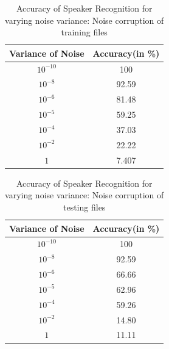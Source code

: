 \documentclass{article}
\begin{document}
{\begin{table}[!h]
\centering
\begin{tabular}{|c|c|}
\hline
\multicolumn{1}{|l|}{Variance of Noise} & \multicolumn{1}{l|}{Accuracy(in \%)} \\ \hline
$10^{-10}$               & 100                                 \\ \hline
$10^{-8}$                & 92.59                               \\ \hline
$10^{-6}$                & 81.48                               \\ \hline
$10^{-5}$                & 59.25                               \\ \hline
$10^{-4}$                & 37.03                               \\ \hline
$10^{-2}$                & 22.22                               \\ \hline
$1$                       & 7.407                              \\ \hline
\end{tabular}
\caption{Accuracy of Speaker Recognition for varying noise variance: Noise corruption of training files}
\label{Table1}
\end{table}

\begin{table}[!h]
\centering
\begin{tabular}{|c|c|}
\hline
\multicolumn{1}{|l|}{Variance of Noise} & \multicolumn{1}{l|}{Accuracy(in \%)} \\ \hline
$10^{-10}$               & 100                                 \\ \hline
$10^{-8}$                & 92.59                               \\ \hline
$10^{-6}$                & 66.66                               \\ \hline
$10^{-5}$                & 62.96                               \\ \hline
$10^{-4}$                & 59.26                               \\ \hline
$10^{-2}$                & 14.80                               \\ \hline
$1$                       & 11.11                              \\ \hline
\end{tabular}
\caption{Accuracy of Speaker Recognition for varying noise variance: Noise corruption of testing files}
\label{Table2}
\end{table}

}
\end{document}
